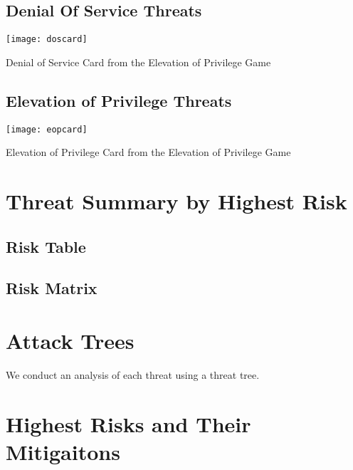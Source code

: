 \subsection{Denial Of Service Threats}
\begin{marginfigure}%
\centering
  \texttt{[image: doscard]}
  \caption{Denial of Service Card from the Elevation of Privilege Game}
  \label{fig:doscard}
\end{marginfigure}

\subsection{Elevation of Privilege Threats}
\begin{marginfigure}%
\centering
  \texttt{[image: eopcard]}
  \caption{Elevation of Privilege Card from the Elevation of Privilege Game}
  \label{fig:eopcard}
\end{marginfigure}


\section{Threat Summary by Highest Risk}

\subsection{Risk Table}

\subsection{Risk Matrix}

\section{Attack Trees}
We conduct an analysis of each threat using a threat tree.

\section{Highest Risks and Their Mitigaitons}




